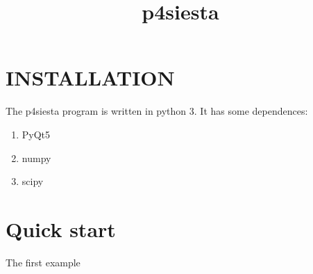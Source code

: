 \documentclass[a4paper,
               fontsize=14pt, 
               DIV=calc,
               twoside=false,
               headings=small,
               numbers=endperiod,
               bibliography=totoc,
              ]{scrbook}
\title{p4siesta}
\theoremstyle{examplestyle}
\theoremstyle{remark}
\begin{document}
	
\renewcommand\bibname{Библиографический список}	
\makeatletter
\renewcommand\@biblabel[1]{#1.}
\makeatother

\let\oldthebibliography\thebibliography
\let\endoldthebibliography\endthebibliography
\renewenvironment{thebibliography}[1]{
  \begin{oldthebibliography}{#1}
    \setlength{\itemsep}{3pt}
    \setlength{\parskip}{0em}
}
{
  \end{oldthebibliography}
}
%

                        
\graphicspath{{./figure/}}
%
\maketitle

\tableofcontents




\chapter{INSTALLATION}

The p4siesta program is written in python 3. It has some dependences:
\begin{enumerate}
	\item PyQt5
	\item numpy
	\item scipy
\end{enumerate} 


\chapter{Quick start}

The first example




\end{document}
